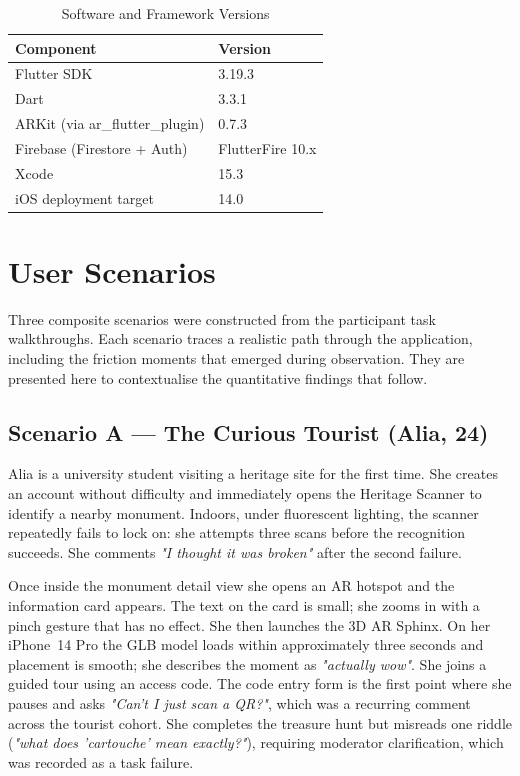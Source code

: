 \begin{table}[htbp]
  \centering
  \caption{Software and Framework Versions}
  \label{tab:sw-spec}
  \begin{tabular}{ll}
    \toprule
    \textbf{Component}        & \textbf{Version} \\
    \midrule
    Flutter SDK               & 3.19.3 \\
    Dart                      & 3.3.1 \\
    ARKit (via ar\_flutter\_plugin) & 0.7.3 \\
    Firebase (Firestore + Auth) & FlutterFire 10.x \\
    Xcode                     & 15.3 \\
    iOS deployment target     & 14.0 \\
    \bottomrule
  \end{tabular}
\end{table}

\section{User Scenarios}
\label{sec:scenarios}

Three composite scenarios were constructed from the participant task walkthroughs.
Each scenario traces a realistic path through the application, including the friction
moments that emerged during observation. They are presented here to contextualise the
quantitative findings that follow.

\subsection*{Scenario A — The Curious Tourist (Alia, 24)}

Alia is a university student visiting a heritage site for the first time. She creates
an account without difficulty and immediately opens the Heritage Scanner to identify a
nearby monument. Indoors, under fluorescent lighting, the scanner repeatedly fails to
lock on: she attempts three scans before the recognition succeeds. She comments
\textit{"I thought it was broken"} after the second failure.

Once inside the monument detail view she opens an AR hotspot and the information card
appears. The text on the card is small; she zooms in with a pinch gesture that has no
effect. She then launches the 3D AR Sphinx. On her iPhone~14 Pro the GLB model loads
within approximately three seconds and placement is smooth; she describes the moment as
\textit{"actually wow"}. She joins a guided tour using an access code. The code entry
form is the first point where she pauses and asks \textit{"Can't I just scan a QR?"},
which was a recurring comment across the tourist cohort. She completes the treasure hunt
but misreads one riddle (\textit{"what does 'cartouche' mean exactly?"}), requiring
moderator clarification, which was recorded as a task failure.

